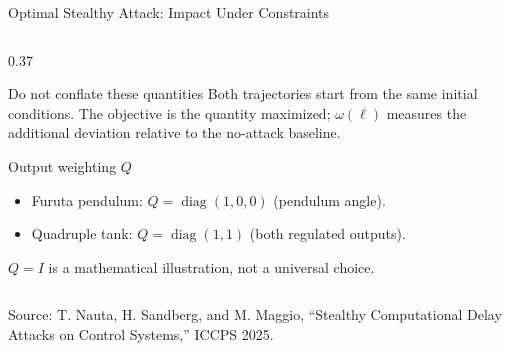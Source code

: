 \documentclass[9pt,aspectratio=169]{beamer}
\newcommand{\paperref}{\tiny Source: T. Nauta, H. Sandberg, and M. Maggio, ``Stealthy Computational Delay Attacks on Control Systems,'' ICCPS 2025.}
\newcommand{\tightitemize}{
    \setlength{\itemsep}{1.5pt}
    \setlength{\parskip}{0pt}
    \setlength{\topsep}{2pt}
}
\begin{document}
\begin{frame}{Optimal Stealthy Attack: Impact Under Constraints}
\begin{columns}[T,onlytextwidth]
\begin{column}{0.37\textwidth}
\begin{block}{Do not conflate these quantities}
\small
Both trajectories start from the same initial conditions.
The objective is the quantity maximized; $\omega(\ell)$
measures the additional deviation relative to the
no-attack baseline.

\end{block}

\begin{block}{Output weighting $Q$}

\scriptsize

\begin{itemize}
\tightitemize
    \item Furuta pendulum:
    $Q=\operatorname{diag}(1,0,0)$
    (pendulum angle).

    \item Quadruple tank:
    $Q=\operatorname{diag}(1,1)$
    (both regulated outputs).
\end{itemize}

$Q=I$ is a mathematical illustration, not a universal choice.

\end{block}

\end{column}
\end{columns}

\vfill
{\paperref}

\end{frame}
\end{document}
